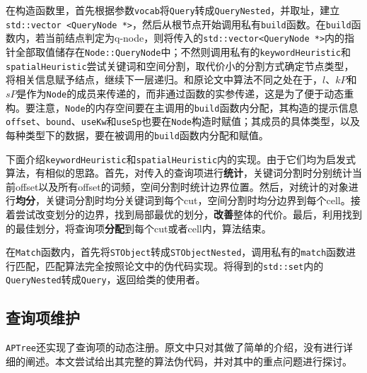 \documentclass[UTF8]{ctexart}
\begin{document}
在构造函数里，首先根据参数\texttt{vocab}将\texttt{Query}转成\texttt{QueryNested}，并取址，建立\texttt{std::vector <QueryNode *>}，然后从根节点开始调用私有\texttt{build}函数。在\texttt{build}函数内，若当前结点判定为q-node，则将传入的\texttt{std::vector<QueryNode *>}内的指针全部取值储存在\texttt{Node::QueryNode}中；不然则调用私有的\texttt{keywordHeuristic}和\texttt{spatialHeuristic}尝试关键词和空间分割，取代价小的分割方式确定节点类型，将相关信息赋予结点，继续下一层递归。和原论文中算法不同之处在于，$l$、$kP$和$sP$是作为\texttt{Node}的成员来传递的，而非通过函数的实参传递，这是为了便于动态重构。要注意，\texttt{Node}的内存空间要在主调用的\texttt{build}函数内分配，其构造的提示信息\texttt{offset}、\texttt{bound}、\texttt{useKw}和\texttt{useSp}也要在\texttt{Node}构造时赋值；其成员的具体类型，以及每种类型下的数据，要在被调用的\texttt{build}函数内分配和赋值。

下面介绍\texttt{keywordHeuristic}和\texttt{spatialHeuristic}内的实现。由于它们均为启发式算法，有相似的思路。首先，对传入的查询项进行\textbf{统计}，关键词分割时分别统计当前offset以及所有offset的词频，空间分割时统计边界位置。然后，对统计的对象进行\textbf{均分}，关键词分割时均分关键词到每个cut，空间分割时均分边界到每个cell。接着尝试改变划分的边界，找到局部最优的划分，\textbf{改善}整体的代价。最后，利用找到的最佳划分，将查询项\textbf{分配}到每个cut或者cell内，算法结束。

在\texttt{Match}函数内，首先将\texttt{STObject}转成\texttt{STObjectNested}，调用私有的\texttt{match}函数进行匹配，匹配算法完全按照论文中的伪代码实现。将得到的\texttt{std::set}内的\texttt{QueryNested}转成\texttt{Query}，返回给类的使用者。

\subsection{查询项维护}
\texttt{APTree}还实现了查询项的动态注册。原文中只对其做了简单的介绍，没有进行详细的阐述。本文尝试给出其完整的算法伪代码，并对其中的重点问题进行探讨。
\end{document}
